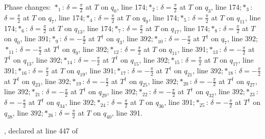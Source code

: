 \par\smallskip\begin{minipage}{.98\linewidth}\small Phase changes: $\ast_{1}$: $\delta=\frac{\pi}{2}$ at $T$ on $q_{0}$, line 174;\quad $\ast_{2}$: $\delta=\frac{\pi}{2}$ at $T$ on $q_{3}$, line 174;\quad $\ast_{3}$: $\delta=\frac{\pi}{2}$ at $T$ on $q_{7}$, line 174;\quad $\ast_{4}$: $\delta=\frac{\pi}{2}$ at $T$ on $q_{9}$, line 174;\quad $\ast_{5}$: $\delta=\frac{\pi}{2}$ at $T$ on $q_{11}$, line 174;\quad $\ast_{6}$: $\delta=\frac{\pi}{2}$ at $T$ on $q_{13}$, line 174;\quad $\ast_{7}$: $\delta=\frac{\pi}{2}$ at $T$ on $q_{17}$, line 174;\quad $\ast_{8}$: $\delta=\frac{\pi}{2}$ at $T$ on $q_{0}$, line 391;\quad $\ast_{9}$: $\delta=-\frac{\pi}{2}$ at $T^\dagger$ on $q_{3}$, line 392;\quad $\ast_{10}$: $\delta=-\frac{\pi}{2}$ at $T^\dagger$ on $q_{7}$, line 392;\quad $\ast_{11}$: $\delta=-\frac{\pi}{2}$ at $T^\dagger$ on $q_{9}$, line 392;\quad $\ast_{12}$: $\delta=\frac{\pi}{2}$ at $T$ on $q_{11}$, line 391;\quad $\ast_{13}$: $\delta=-\frac{\pi}{2}$ at $T^\dagger$ on $q_{13}$, line 392;\quad $\ast_{14}$: $\delta=-\frac{\pi}{2}$ at $T^\dagger$ on $q_{15}$, line 392;\quad $\ast_{15}$: $\delta=\frac{\pi}{2}$ at $T$ on $q_{17}$, line 391;\quad $\ast_{16}$: $\delta=\frac{\pi}{2}$ at $T$ on $q_{19}$, line 391;\quad $\ast_{17}$: $\delta=-\frac{\pi}{2}$ at $T^\dagger$ on $q_{21}$, line 392;\quad $\ast_{18}$: $\delta=-\frac{\pi}{2}$ at $T^\dagger$ on $q_{23}$, line 392;\quad $\ast_{19}$: $\delta=-\frac{\pi}{2}$ at $T^\dagger$ on $q_{25}$, line 392;\quad $\ast_{20}$: $\delta=-\frac{\pi}{2}$ at $T^\dagger$ on $q_{27}$, line 392;\quad $\ast_{21}$: $\delta=-\frac{\pi}{2}$ at $T^\dagger$ on $q_{29}$, line 392;\quad $\ast_{22}$: $\delta=-\frac{\pi}{2}$ at $T^\dagger$ on $q_{32}$, line 392;\quad $\ast_{23}$: $\delta=-\frac{\pi}{2}$ at $T^\dagger$ on $q_{34}$, line 392;\quad $\ast_{24}$: $\delta=\frac{\pi}{2}$ at $T$ on $q_{36}$, line 391;\quad $\ast_{25}$: $\delta=-\frac{\pi}{2}$ at $T^\dagger$ on $q_{38}$, line 392;\quad $\ast_{26}$: $\delta=\frac{\pi}{2}$ at $T$ on $q_{40}$, line 391.\end{minipage}
\vfill
{\footnotesize\texttt{}, declared at line 447 of \texttt{}}
\newpage


